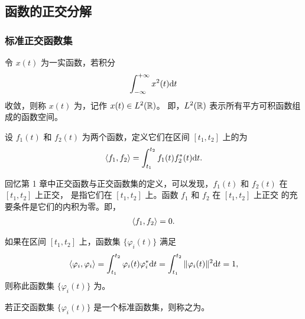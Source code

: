 \subsection{函数的正交分解}

\subsubsection{标准正交函数集}

\begin{definition}[平方可积函数]
    令 $x(t)$ 为一实函数，若积分
    \begin{align*}
        \int_{-\infty}^{+\infty}x^2(t)\mathrm{d}t
    \end{align*}
    收敛，则称 $x(t)$ 为，记作 $x(t) \in L^2(\mathbb{R})$。
    即，$L^2(\mathbb{R})$ 表示所有平方可积函数组成的函数空间。
\end{definition}

\begin{definition}[内积]
    设 $f_1(t)$ 和 $f_2(t)$ 为两个函数，定义它们在区间 $[t_1, t_2]$ 上的为
    \begin{align*}
        \left\langle f_1, f_2\right\rangle = \int_{t_1}^{t_2}f_1(t)f_2^*(t)\mathrm{d}t.
    \end{align*}
\end{definition}

\begin{remark}
    回忆第 1 章中正交函数与正交函数集的定义，可以发现，$f_1(t)$ 和 $f_2(t)$ 在 $[t_1, t_2]$ 上正交，
    是指它们在 $[t_1, t_2]$ 上。函数 $f_1$ 和 $f_2$ 在 $[t_1, t_2]$ 上正交
    的充要条件是它们的内积为零。即，
    \begin{align*}
        \left\langle f_1, f_2\right\rangle = 0.
    \end{align*}
\end{remark}

\begin{definition}[标准函数集]
    如果在区间 $[t_1, t_2]$ 上，函数集 $\{\varphi_i(t)\}$ 满足
    \begin{align*}
        \left\langle\varphi_i, \varphi_i\right\rangle = \int_{t_1}^{t_2}\varphi_i(t)\varphi_i^*\mathrm{d}t
            = \int_{t_1}^{t_2}\|\varphi_i(t)\|^2\mathrm{d}t = 1,
    \end{align*}
    则称此函数集 $\{\varphi_i(t)\}$ 为。
\end{definition}

\begin{definition}[标准正交函数集]
    若正交函数集 $\{\varphi_i(t)\}$ 是一个标准函数集，则称之为。
\end{definition}

